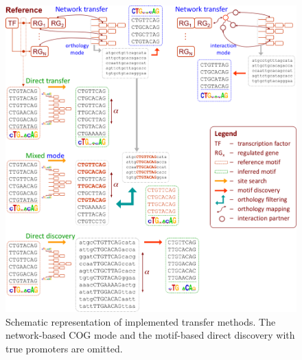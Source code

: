 \begin{figure}
  \centering
  \includegraphics[width=\textwidth]{figures/chapter3/transfer-methods}
  \caption[Schematic representation of implemented transfer methods.]{Schematic
    representation of implemented transfer methods. The network-based COG mode
    and the motif-based direct discovery with true promoters are omitted.}
\label{fig:transfer-methods}
\end{figure}

